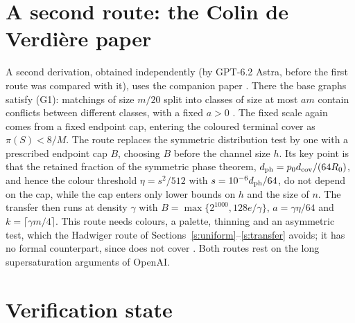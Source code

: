 \documentclass[11pt]{article}
\theoremstyle{definition}\newtheorem{conjecture}[theorem]{Conjecture}
\theoremstyle{remark}\newtheorem{remark}[theorem]{Remark}
\begin{document}
\section{A second route: the Colin de Verdi\`ere paper}\label{s:second}
A second derivation, obtained independently (by GPT-6.2 Astra, before the first route was compared with it), uses the
companion paper \cite{OAIC}. There the base graphs satisfy (G1): matchings of size $m/20$ split into classes of size at most
$am$ contain conflicts between different classes, with a fixed $a>0$ \cite[thm:base-graphs]{OAIC}. The fixed scale again comes
from a fixed endpoint cap, entering the coloured terminal cover as $\pi(S)<8/M$. The route replaces the symmetric
distribution test by one with a prescribed endpoint cap $B$, choosing $B$ before the channel size $h$. Its key point is that
the retained fraction of the symmetric phase theorem, $d_{\rm ph}=p_0d_{\rm cov}/(64R_0)$, and hence the colour threshold
$\eta=s^2/512$ with $s=10^{-6}d_{\rm ph}/64$, do not depend on the cap, while the cap enters only lower bounds on $h$ and
the size of $n$. The transfer then runs at density $\gamma$ with $B=\max\{2^{1000},128e/\gamma\}$, $a=\gamma\eta/64$ and
$k=\lceil\gamma m/4\rceil$. This route needs colours, a palette, thinning and an asymmetric test, which the Hadwiger route of
Sections~\ref{s:uniform}--\ref{s:transfer} avoids; it has no formal counterpart, since \cite{OAIL} does not cover \cite{OAIC}.
Both routes rest on the long supersaturation arguments of OpenAI.

\section{Verification state}\label{s:verify}
\end{document}
